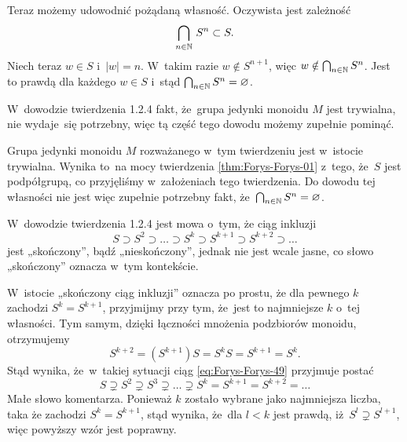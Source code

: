 \documentclass[a4paper,11pt]{article}
\begin{document}
Teraz możemy udowodnić pożądaną własność. Oczywista jest zależność
\begin{equation}
  \label{eq:Forys-Forys-48}
  \bigcap_{ n \in \mathbb{N} } \, S^{ n } \subset S.
\end{equation}
Niech teraz $w \in S$ i~$| w | = n$. W~takim razie
$w \notin S^{ n + 1 }$, więc
$w \notin \bigcap_{ n \in \mathbb{N} } S^{ n }$. Jest to prawdą dla każdego
$w \in S$ i~stąd $\bigcap_{ n \in \mathbb{N} } S^{ n } = \varnothing$.

\vspace{\spaceFour}





 W~dowodzie twierdzenia 1.2.4 fakt, że~grupa jedynki
monoidu $M$ jest trywialna, nie wydaje~się potrzebny, więc tą część
tego dowodu możemy zupełnie pominąć.

Grupa jedynki monoidu $M$ rozważanego w~tym twierdzeniu jest w~istocie
trywialna. Wynika to~na mocy twierdzenia \ref{thm:Forys-Forys-01}
z~tego, że~$S$ jest podpółgrupą, co przyjęliśmy w~założeniach tego
twierdzenia. Do dowodu tej własności nie jest więc zupełnie potrzebny
fakt, że~$\bigcap_{ n \in \mathbb{N} } S^{ n } = \varnothing$.

\vspace{\spaceFour}





 W~dowodzie twierdzenia 1.2.4 jest mowa o~tym, że ciąg inkluzji
\begin{equation}
  \label{eq:Forys-Forys-49}
  S \supset S^{ 2 } \supset \ldots \supset S^{ k } \supset S^{ k + 1 } \supset S^{ k + 2 } \supset \ldots
\end{equation}
jest „skończony”, bądź „nieskończony”, jednak nie jest wcale jasne, co
słowo „skończony” oznacza w~tym kontekście.

W~istocie „skończony ciąg inkluzji” oznacza po prostu, że dla pewnego
$k$ zachodzi $S^{ k } = S^{ k + 1 }$, przyjmijmy przy tym, że~jest to
najmniejsze $k$ o~tej własności. Tym samym, dzięki łączności mnożenia
podzbiorów monoidu, otrzymujemy
\begin{equation}
  \label{eq:Forys-Forys-50}
  S^{ k + 2 } = ( S^{ k + 1 } ) S = S^{ k } S = S^{ k + 1 } = S^{ k }.
\end{equation}
Stąd wynika, że~w~takiej sytuacji ciąg \eqref{eq:Forys-Forys-49}
przyjmuje postać
\begin{equation}
  \label{eq:Forys-Forys-51}
  S \supsetneq S^{ 2 } \supsetneq S^{ 3 } \supsetneq \ldots \supsetneq S^{ k } = S^{ k + 1 } = S^{ k + 2 } = \ldots
\end{equation}
Małe słowo komentarza. Ponieważ $k$ zostało wybrane jako najmniejsza
liczba, taka że zachodzi $S^{ k } = S^{ k + 1 }$, stąd wynika, że~dla
$l < k$ jest prawdą, iż~$S^{ l } \supsetneq S^{ l + 1 }$, więc powyższy wzór
jest poprawny.
\end{document}

